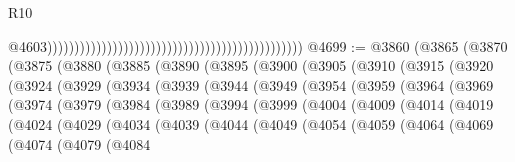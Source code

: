 \begin{lexlean}{R10}
\begin{coremodule}
                                                                                                  @4603)))))))))))))))))))))))))))))))))))))))))))))))
@4699 := @3860
    (@3865
      (@3870
        (@3875
          (@3880
            (@3885
              (@3890
                (@3895
                  (@3900
                    (@3905
                      (@3910
                        (@3915
                          (@3920
                            (@3924
                              (@3929
                                (@3934
                                  (@3939
                                    (@3944
                                      (@3949
                                        (@3954
                                          (@3959
                                            (@3964
                                              (@3969
                                                (@3974
                                                  (@3979
                                                    (@3984
                                                      (@3989
                                                        (@3994
                                                          (@3999
                                                            (@4004
                                                              (@4009
                                                                (@4014
                                                                  (@4019
                                                                    (@4024
                                                                      (@4029
                                                                        (@4034
                                                                          (@4039
                                                                            (@4044
                                                                              (@4049
                                                                                (@4054
                                                                                  (@4059
                                                                                    (@4064
                                                                                      (@4069
                                                                                        (@4074
                                                                                          (@4079
                                                                                            (@4084

\end{coremodule}
\end{lexlean}
